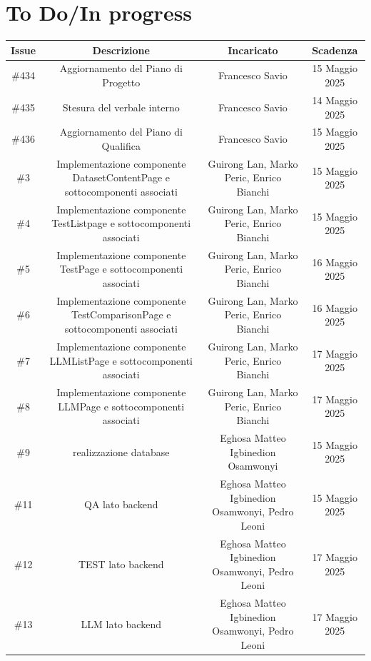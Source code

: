\documentclass[a4paper, 12pt]{article}
\begin{document}
\section{To Do/In progress}
\begin{tabularx}{\textwidth}{|c|C|C|C|}
    \hline
        \textbf{Issue} & \textbf{Descrizione} & \textbf{Incaricato} & \textbf{Scadenza}\\
    \hline    
        \#434 & Aggiornamento del Piano di Progetto & Francesco Savio & 15 Maggio 2025\\
    \hline 
        \#435 & Stesura del verbale interno & Francesco Savio & 14 Maggio 2025\\
    \hline
        \#436 & Aggiornamento del Piano di Qualifica & Francesco Savio & 15 Maggio 2025\\
    \hline
        \#3 & Implementazione componente DatasetContentPage e sottocomponenti associati & Guirong Lan, Marko Peric, Enrico Bianchi & 15 Maggio 2025\\
    \hline
        \#4 & Implementazione componente TestListpage e sottocomponenti associati & Guirong Lan, Marko Peric, Enrico Bianchi & 15 Maggio 2025\\
    \hline
        \#5 & Implementazione componente TestPage e sottocomponenti associati & Guirong Lan, Marko Peric, Enrico Bianchi & 16 Maggio 2025\\
    \hline
        \#6 & Implementazione componente TestComparisonPage e sottocomponenti associati & Guirong Lan, Marko Peric, Enrico Bianchi & 16 Maggio 2025\\
    \hline
        \#7 & Implementazione componente LLMListPage e sottocomponenti associati & Guirong Lan, Marko Peric, Enrico Bianchi & 17 Maggio 2025\\
    \hline
        \#8 & Implementazione componente LLMPage e sottocomponenti associati & Guirong Lan, Marko Peric, Enrico Bianchi & 17 Maggio 2025\\
    \hline    
        \#9 & realizzazione database & Eghosa Matteo Igbinedion Osamwonyi & 15 Maggio 2025\\
    \hline  
        \#11 & QA lato backend & Eghosa Matteo Igbinedion Osamwonyi, Pedro Leoni & 15 Maggio 2025\\
    \hline
        \#12 & TEST lato backend & Eghosa Matteo Igbinedion Osamwonyi, Pedro Leoni & 17 Maggio 2025\\
    \hline
        \#13 & LLM lato backend & Eghosa Matteo Igbinedion Osamwonyi, Pedro Leoni & 17 Maggio 2025\\
    \hline
    \end{tabularx}
\end{document}

